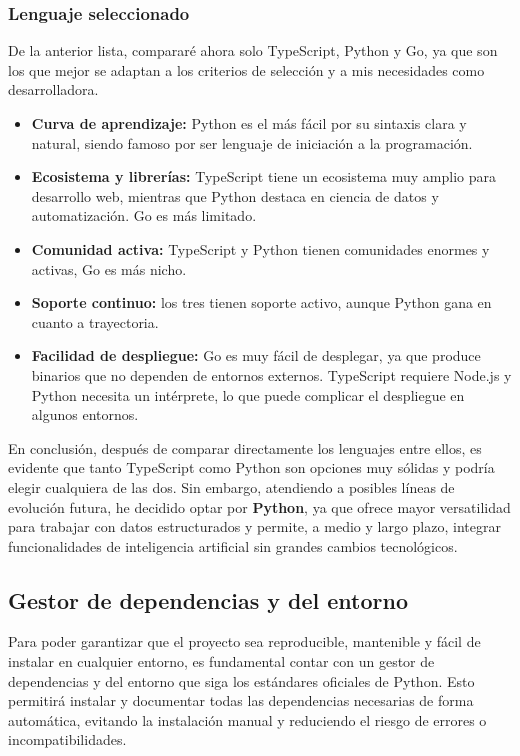 \subsubsection{Lenguaje seleccionado}
De la anterior lista, compararé ahora solo TypeScript, Python y Go, ya que son los que
mejor se adaptan a los criterios de selección y a mis necesidades como desarrolladora.

\begin{itemize}
    \item \textbf{Curva de aprendizaje:} Python es el más fácil por su sintaxis clara y
    natural, siendo famoso por ser lenguaje de iniciación a la programación.
    \item \textbf{Ecosistema y librerías:} TypeScript tiene un ecosistema muy amplio 
    para desarrollo web, mientras que Python destaca en ciencia de datos y automatización.
    Go es más limitado.
    \item \textbf{Comunidad activa:} TypeScript y Python tienen comunidades enormes y
    activas, Go es más nicho.
    \item \textbf{Soporte continuo:} los tres tienen soporte activo, aunque Python gana en
    cuanto a trayectoria.
    \item \textbf{Facilidad de despliegue:} Go es muy fácil de desplegar, ya que produce
    binarios que no dependen de entornos externos. TypeScript requiere Node.js
    y Python necesita un intérprete, lo que puede complicar el despliegue en algunos
    entornos.
\end{itemize}

En conclusión, después de comparar directamente los lenguajes entre ellos, es evidente
que tanto TypeScript como Python son opciones muy sólidas y podría elegir cualquiera de las
dos. Sin embargo, atendiendo a posibles líneas de evolución futura, he decidido optar por
\textbf{Python}, ya que ofrece mayor versatilidad para trabajar con datos estructurados y 
permite, a medio y largo plazo, integrar funcionalidades de inteligencia artificial sin 
grandes cambios tecnológicos.

\subsection{Gestor de dependencias y del entorno}
Para poder garantizar que el proyecto sea reproducible, mantenible y fácil de instalar en 
cualquier entorno, es fundamental contar con un gestor de dependencias y del entorno que
siga los estándares oficiales de Python. 
Esto permitirá instalar y documentar todas las dependencias necesarias de forma automática,
evitando la instalación manual y reduciendo el riesgo de errores o incompatibilidades. 


